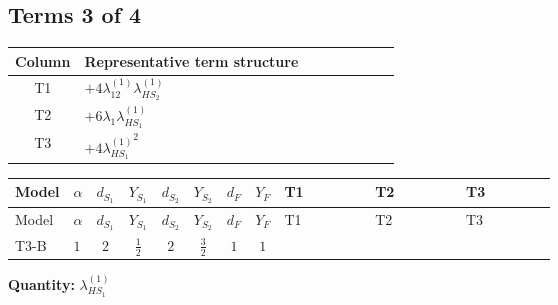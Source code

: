 \documentclass[8pt]{article}
\begin{document}
\begin{landscape}
\subsection*{Terms 3 of 4}
\begin{center}
\begin{tabular}{@{}c >{\raggedright\arraybackslash}p{0.82\linewidth}@{}}
\toprule
Column & Representative term structure \\
\midrule
T1 & \(\displaystyle +4 {\lambda_{12}^{(1)}} {\lambda_{HS_2}^{(1)}}\) \\
\midrule
T2 & \(\displaystyle +6 {\lambda_1} {\lambda_{HS_1}^{(1)}}\) \\
\midrule
T3 & \(\displaystyle +4 {\lambda_{HS_1}^{(1)}}^2\) \\
\midrule
\bottomrule
\end{tabular}
\end{center}
\smallskip
\tiny
\begin{longtable}{@{}llcccccc >{\raggedright\arraybackslash}p{0.21\linewidth} >{\raggedright\arraybackslash}p{0.21\linewidth} >{\raggedright\arraybackslash}p{0.21\linewidth}@{}}
\toprule
Model & $\alpha$ & $d_{S_1}$ & $Y_{S_1}$ & $d_{S_2}$ & $Y_{S_2}$ & $d_F$ & $Y_F$ & T1 & T2 & T3 \\
\midrule
\endfirsthead
\toprule
Model & $\alpha$ & $d_{S_1}$ & $Y_{S_1}$ & $d_{S_2}$ & $Y_{S_2}$ & $d_F$ & $Y_F$ & T1 & T2 & T3 \\
\midrule
\endhead
T3-B & $1$ & $2$ & $\frac{1}{2}$ & $2$ & $\frac{3}{2}$ & $1$ & $1$ & \scriptsize\adjustbox{max width=\linewidth}{$\begin{gathered} +4 {\lambda_{12}^{(1)}} {\lambda_{HS_2}^{(1)}}\end{gathered}$} & \scriptsize\adjustbox{max width=\linewidth}{$\begin{gathered} +6 {\lambda_1} {\lambda_{HS_1}^{(1)}}\end{gathered}$} & \scriptsize\adjustbox{max width=\linewidth}{$\begin{gathered} +4 {\lambda_{HS_1}^{(1)}}^2\end{gathered}$} \\
\midrule
\bottomrule
\end{longtable}
\clearpage
\noindent\textbf{Quantity: }$\lambda_{HS_1}^{(1)}$\par\smallskip

\end{landscape}
\end{document}

